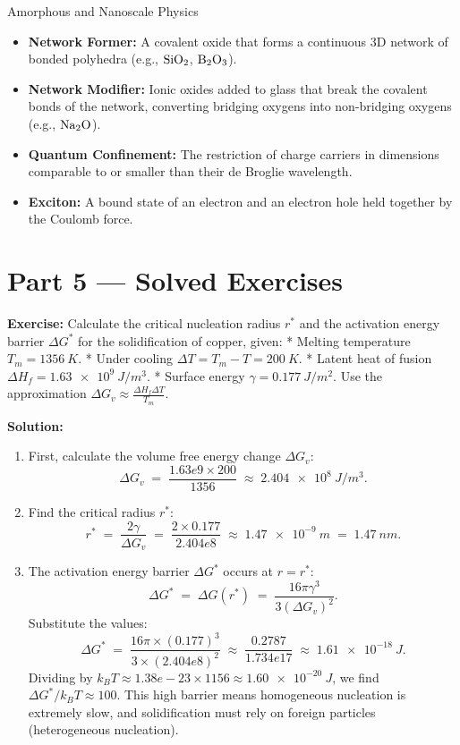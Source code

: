 \documentclass[12pt, a4paper]{book}
\newcommand{\important}[1]{\textcolor{ModuleColor}{\textbf{#1}}}
\begin{document}
\begin{namedconcept}{Amorphous and Nanoscale Physics}
\begin{itemize}
  \item \important{Network Former:} A covalent oxide that forms a continuous 3D network of bonded polyhedra (e.g., $\ce{SiO2}$, $\ce{B2O3}$).
  \item \important{Network Modifier:} Ionic oxides added to glass that break the covalent bonds of the network, converting bridging oxygens into non-bridging oxygens (e.g., $\ce{Na2O}$).
  \item \important{Quantum Confinement:} The restriction of charge carriers in dimensions comparable to or smaller than their de Broglie wavelength.
  \item \important{Exciton:} A bound state of an electron and an electron hole held together by the Coulomb force.
\end{itemize}
\end{namedconcept}

\newpage

\section{Part 5 --- Solved Exercises}

\begin{problembox}
\textbf{Exercise:} Calculate the critical nucleation radius $r^*$ and the activation energy barrier $\Delta G^*$ for the solidification of copper, given:
* Melting temperature $T_m = \SI{1356}{K}$.
* Under cooling $\Delta T = T_m - T = \SI{200}{K}$.
* Latent heat of fusion $\Delta H_f = \SI{1.63e9}{J/m^3}$.
* Surface energy $\gamma = \SI{0.177}{J/m^2}$.
Use the approximation $\Delta G_v \approx \frac{\Delta H_f \Delta T}{T_m}$.

\textbf{Solution:}
\begin{enumerate}
  \item First, calculate the volume free energy change $\Delta G_v$:
        \[
          \Delta G_v \;=\; \frac{1.63e9 \times 200}{1356} \;\approx\; \SI{2.404e8}{J/m^3}.
        \]
  \item Find the critical radius $r^*$:
        \[
          r^* \;=\; \frac{2\gamma}{\Delta G_v} \;=\; \frac{2 \times 0.177}{2.404e8} \;\approx\; \SI{1.47e-9}{m} \;=\; \SI{1.47}{nm}.
        \]
  \item The activation energy barrier $\Delta G^*$ occurs at $r = r^*$:
        \[
          \Delta G^* \;=\; \Delta G(r^*) \;=\; \frac{16\pi \gamma^3}{3 (\Delta G_v)^2}.
        \]
        Substitute the values:
        \[
          \Delta G^* \;=\; \frac{16\pi \times (0.177)^3}{3 \times (2.404e8)^2} \;\approx\; \frac{0.2787}{1.734e17} \;\approx\; \SI{1.61e-18}{J}.
        \]
        Dividing by $k_B T \approx 1.38e-23 \times 1156 \approx \SI{1.60e-20}{J}$, we find $\Delta G^* / k_B T \approx 100$. This high barrier means homogeneous nucleation is extremely slow, and solidification must rely on foreign particles (heterogeneous nucleation).
\end{enumerate}
\end{problembox}
\end{document}

